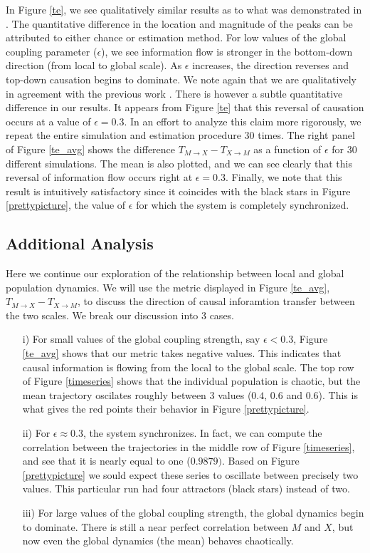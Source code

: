 \documentclass[conference]{IEEEtran}
\begin{document}
\noindent In Figure \ref{te}, we see qualitatively similar results as to what was demonstrated in \cite{Walker}. The quantitative difference in the location and magnitude of the peaks can be attributed to either chance or estimation method. For low values of the global coupling parameter ($\epsilon$), we see information flow is stronger in the bottom-down direction (from local to global scale). As $\epsilon$ increases, the direction reverses and top-down causation begins to dominate. We note again that we are qualitatively in agreement with the previous work \cite{Walker}. There is however a subtle quantitative difference in our results. It appears from Figure \ref{te} that this reversal of causation occurs at a value of $\epsilon = 0.3$. In an effort to analyze this claim more rigorously, we repeat the entire simulation and estimation procedure $30$ times. The right panel of Figure \ref{te_avg} shows the difference $T_{M\rightarrow X} - T_{X \rightarrow M}$ as a function of $\epsilon$ for 30 different simulations. The mean is also plotted, and we can see clearly that this reversal of information flow occurs right at $\epsilon = 0.3$. Finally, we note that this result is intuitively satisfactory since it coincides with the black stars in Figure \ref{prettypicture}, the value of $\epsilon$ for which the system is completely synchronized.

\subsection{Additional Analysis}
\noindent Here we continue our exploration of the relationship between local and global population dynamics. We will use the metric displayed in Figure \ref{te_avg}, $T_{M\rightarrow X} - T_{X\rightarrow M}$, to discuss the direction of causal inforamtion transfer between the two scales. We break our discussion into 3 cases.
\begin{itemize}
\item[i)] For small values of the global coupling strength, say $\epsilon < 0.3$, Figure \ref{te_avg} shows that our metric takes negative values. This indicates that causal information is flowing from the local to the global scale. The top row of Figure \ref{timeseries} shows that the individual population is chaotic, but the mean trajectory oscilates roughly between 3 values ($0.4$, $0.6$ and $0.6$). This is what gives the red points their behavior in Figure \ref{prettypicture}.
\item[ii)] For $\epsilon \approx 0.3$, the system synchronizes. In fact, we can compute the correlation between the trajectories in the middle row of Figure \ref{timeseries}, and see that it is nearly equal to one ($0.9879)$. Based on Figure \ref{prettypicture} we sould expect these series to oscillate between precisely two values. This particular run had four attractors (black stars) instead of two.
\item[iii)] For large values of the global coupling strength, the global dynamics begin to dominate. There is still a near perfect correlation between $M$ and $X$, but now even the global dynamics (the mean) behaves chaotically.
\end{itemize}
\end{document}
